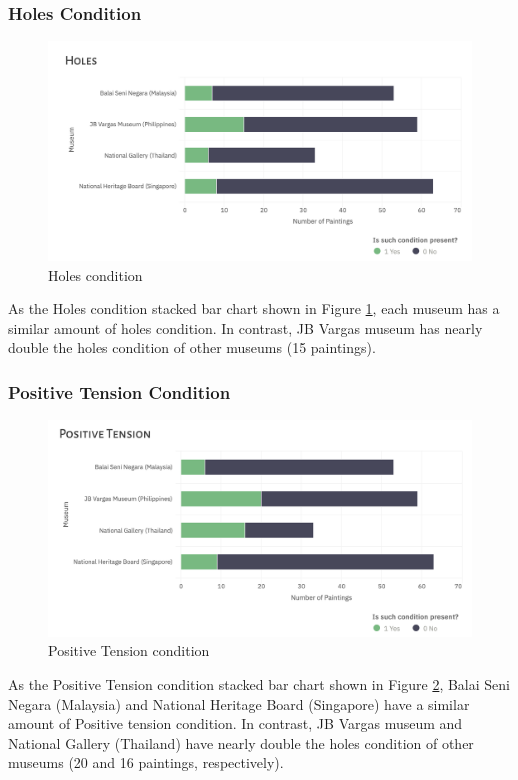 \documentclass[11pt, oneside]{article}
\begin{document}
\subsubsection{Holes Condition}
\begin{figure}[H]
    \centering
    \includegraphics[scale=0.5]{images/Holes_painting_con.png}
    \caption{Holes condition}
    \label{Holes_painting_con}
\end{figure}
As the Holes condition stacked bar chart shown in Figure \ref{Holes_painting_con}, each museum has a similar amount of holes condition. In contrast, JB Vargas museum has nearly double the holes condition of other museums (15 paintings).

\subsubsection{Positive Tension Condition}
\begin{figure}[H]
    \centering
    \includegraphics[scale=0.5]{images/Positive_Ten_painting_con.png}
    \caption{Positive Tension condition}
    \label{Positive_Ten_painting_con}
\end{figure}
As the Positive Tension condition stacked bar chart shown in Figure \ref{Positive_Ten_painting_con}, Balai Seni Negara (Malaysia) and National Heritage Board (Singapore) have a similar amount of Positive tension condition. In contrast, JB Vargas museum and National Gallery (Thailand) have nearly double the holes condition of other museums (20 and 16 paintings, respectively).
\end{document}
